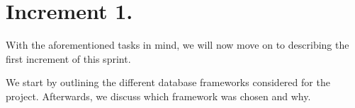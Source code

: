 \section{Increment 1.}
With the aforementioned tasks in mind, we will now move on to describing the first increment of this sprint.

We start by outlining the different database frameworks considered for the project.
Afterwards, we discuss which framework was chosen and why.




